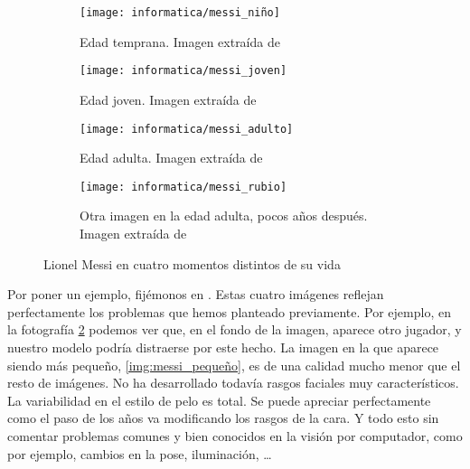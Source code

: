 \begin{figure}[H]
\centering
    \begin{subfigure}{0.5\textwidth}
        \centering
        \texttt{[image: informatica/messi\_niño]}
        \caption{Edad temprana. Imagen extraída de \cite{informatica:webimg_messi_pequeno}}
        \label{img:messi_pequeno}
    \end{subfigure}%
    \begin{subfigure}{.5\textwidth}
        \centering
        \texttt{[image: informatica/messi\_joven]}
        \caption{Edad joven. Imagen extraída de \cite{informatica:webimg_messi_joven}}
    \end{subfigure}%

    \begin{subfigure}{.5\textwidth}
        \centering
        \texttt{[image: informatica/messi\_adulto]}
        \caption{Edad adulta. Imagen extraída de \cite{informatica:webimg_messi_adulto}}
        \label{img:messi_adulto}
    \end{subfigure}%
    \begin{subfigure}{.5\textwidth}
        \centering
        \texttt{[image: informatica/messi\_rubio]}
        \caption{Otra imagen en la edad adulta, pocos años después. Imagen extraída de \cite{informatica:webimg_messi_rubio}}
    \end{subfigure}

    \caption{Lionel Messi en cuatro momentos distintos de su vida}
    \label{img:messi_cuatro_edades}

\end{figure}

Por poner un ejemplo, fijémonos en . Estas cuatro imágenes reflejan perfectamente los problemas que hemos planteado previamente. Por ejemplo, en la fotografía \ref{img:messi_adulto} podemos ver que, en el fondo de la imagen, aparece otro jugador, y nuestro modelo podría distraerse por este hecho. La imagen en la que aparece siendo más pequeño, \ref{img:messi_pequeño}, es de una calidad mucho menor que el resto de imágenes. No ha desarrollado todavía rasgos faciales muy característicos. La variabilidad en el estilo de pelo es total. Se puede apreciar perfectamente como el paso de los años va modificando los rasgos de la cara. Y todo esto sin comentar problemas comunes y bien conocidos en la visión por computador, como por ejemplo, cambios en la pose, iluminación, \ldots

